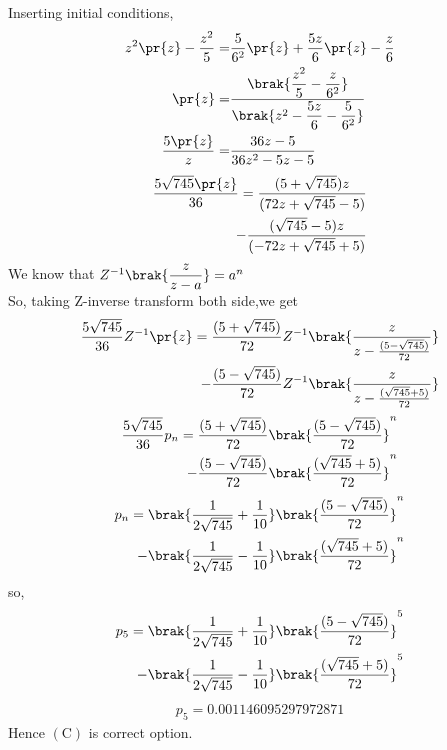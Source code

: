 Inserting initial conditions,
\begin{align}
z^2\pr{z}-\frac{z^2}{5}=&\frac{5}{6^2}\pr{z}+\frac{5z}{6}\pr{z}-\frac{z}{6} \\
\pr{z}=&\dfrac{\brak{\dfrac{z^2}{5}-\dfrac{z}{6^2}}}{\brak{z^2-\dfrac{5z}{6}-\dfrac{5}{6^2}}}\\
\frac{5\pr{z}}{z}=&\frac{36z-5}{36z^2-5z-5}
\end{align}
\begin{align}
\frac{5\sqrt{745}\pr{z}}{36}=\frac{(5+\sqrt{745})z}{(72 z+\sqrt{745}-5)}\\
-\frac{(\sqrt{745}-5)z}{(-72 z+\sqrt{745}+5)}
\end{align}
We know that $Z^{-1}\brak{\dfrac{z}{z-a}}=a^n$\\
So, taking Z-inverse transform both side,we get
\begin{align}
\frac{5\sqrt{745}}{36}Z^{-1}\pr{z}=\dfrac{(5+\sqrt{745})}{72}Z^{-1}\brak{\frac{z}{z-\frac{(5-\sqrt{745})}{72}}}\\
-\frac{(5-\sqrt{745})}{72}Z^{-1}\brak{\frac{z}{z-\frac{(\sqrt{745}+5)}{72}}}
\end{align}
\begin{align}
\frac{5\sqrt{745}}{36}p_n=\frac{(5+\sqrt{745})}{72}\brak{\frac{(5-\sqrt{745})}{72}}^{n}\\
-\frac{(5-\sqrt{745})}{72}\brak{\frac{(\sqrt{745}+5)}{72}}^{n}
\end{align}
\begin{align}
p_n=\brak{\frac{1}{2\sqrt{745}}+\frac{1}{10}}\brak{\frac{(5-\sqrt{745})}{72}}^{n}\\
-\brak{\frac{1}{2\sqrt{745}}-\frac{1}{10}}\brak{\frac{(\sqrt{745}+5)}{72}}^{n}
\end{align}
so,
\begin{align}
p_5=\brak{\frac{1}{2\sqrt{745}}+\frac{1}{10}}\brak{\frac{(5-\sqrt{745})}{72}}^{5}\\
-\brak{\frac{1}{2\sqrt{745}}-\frac{1}{10}}\brak{\frac{(\sqrt{745}+5)}{72}}^{5}
\end{align}
\begin{align}
p_5=0.001146095297972871
\end{align}
Hence $(\mathrm{C})$ is correct option.